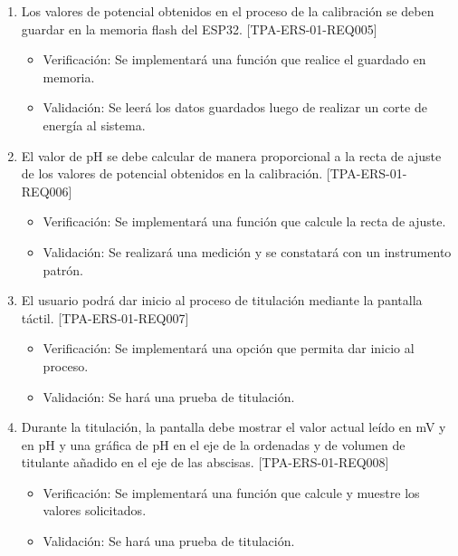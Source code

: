 \documentclass[11pt]{charter}
\begin{document}
\begin{enumerate}
\begin{enumerate}
\begin{itemize}
\end{itemize}
	\item Los valores de potencial obtenidos en el proceso de la calibración se deben guardar en la memoria flash del ESP32. [TPA-ERS-01-REQ005]
	\begin{itemize}
\item Verificación: Se implementará una función que realice el guardado en memoria.\\
\item Validación: Se leerá los datos guardados luego de realizar un corte de energía al sistema.\\
\end{itemize}
	\item El valor de pH se debe calcular de manera proporcional a la recta de ajuste de los valores de potencial obtenidos en la calibración. [TPA-ERS-01-REQ006]
	\begin{itemize}
\item Verificación: Se implementará una función que calcule la recta de ajuste.\\
\item Validación: Se realizará una medición y se constatará con un instrumento patrón.\\
\end{itemize}
	\item El usuario podrá dar inicio al proceso de titulación mediante la pantalla táctil. [TPA-ERS-01-REQ007]
	\begin{itemize}
\item Verificación: Se implementará una opción que permita dar inicio al proceso.\\
\item Validación: Se hará una prueba de titulación.\\
\end{itemize}
	\item Durante la titulación, la pantalla debe mostrar el valor actual leído en mV y en pH y una gráfica de pH en el eje de la ordenadas y de volumen de titulante añadido en el eje de las abscisas. [TPA-ERS-01-REQ008]
	\begin{itemize}
\item Verificación: Se implementará una función que calcule y muestre los valores solicitados.\\
\item Validación: Se hará una prueba de titulación.\\
\end{itemize}


\end{enumerate}
\end{enumerate}
\end{document}
